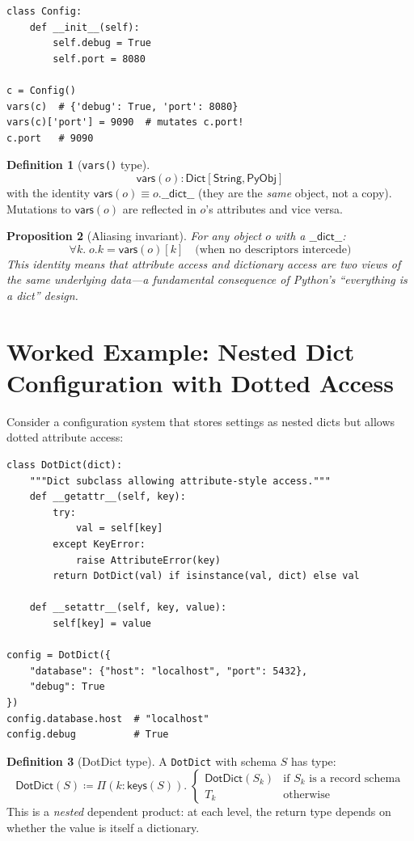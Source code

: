 \documentclass[11pt,a4paper]{report}
\theoremstyle{definition}
\newtheorem{definition}{Definition}[chapter]
\theoremstyle{plain}
\newtheorem{proposition}[definition]{Proposition}
\newcommand{\PyObj}{\mathsf{PyObj}}
\newcommand{\defeq}{\coloneqq}
\begin{document}
\begin{lstlisting}[style=python]
class Config:
    def __init__(self):
        self.debug = True
        self.port = 8080

c = Config()
vars(c)  # {'debug': True, 'port': 8080}
vars(c)['port'] = 9090  # mutates c.port!
c.port   # 9090
\end{lstlisting}

\begin{definition}[\texttt{vars()} type]
\[
  \mathsf{vars}(o) : \mathsf{Dict}[\mathsf{String}, \PyObj]
\]
with the identity $\mathsf{vars}(o) \equiv o.\mathsf{\_\_dict\_\_}$ (they are
the \emph{same} object, not a copy).  Mutations to $\mathsf{vars}(o)$ are
reflected in $o$'s attributes and vice versa.
\end{definition}

\begin{proposition}[Aliasing invariant]
For any object $o$ with a $\mathsf{\_\_dict\_\_}$:
\[
  \forall k.\; o.k = \mathsf{vars}(o)[k] \quad
  \text{(when no descriptors intercede)}
\]
This identity means that attribute access and dictionary access are two
\emph{views} of the same underlying data---a fundamental consequence of
Python's ``everything is a dict'' design.
\end{proposition}

\section{Worked Example: Nested Dict Configuration with Dotted Access}

Consider a configuration system that stores settings as nested dicts
but allows dotted attribute access:

\begin{lstlisting}[style=python]
class DotDict(dict):
    """Dict subclass allowing attribute-style access."""
    def __getattr__(self, key):
        try:
            val = self[key]
        except KeyError:
            raise AttributeError(key)
        return DotDict(val) if isinstance(val, dict) else val

    def __setattr__(self, key, value):
        self[key] = value

config = DotDict({
    "database": {"host": "localhost", "port": 5432},
    "debug": True
})
config.database.host  # "localhost"
config.debug          # True
\end{lstlisting}

\begin{definition}[DotDict type]
A \lstinline[style=python]{DotDict} with schema $S$ has type:
\[
  \mathsf{DotDict}(S) \defeq \Pi(k : \mathsf{keys}(S)).\;
    \begin{cases}
      \mathsf{DotDict}(S_k) & \text{if } S_k \text{ is a record schema} \\
      T_k & \text{otherwise}
    \end{cases}
\]
This is a \emph{nested} dependent product: at each level, the return type
depends on whether the value is itself a dictionary.
\end{definition}
\end{document}
